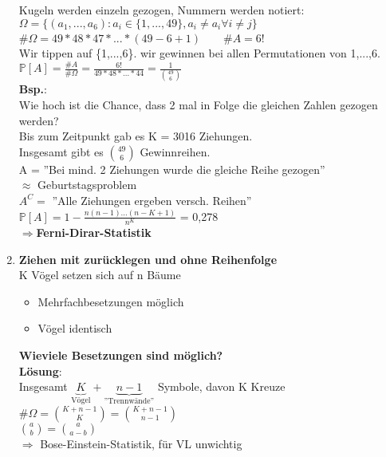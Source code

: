 \begin{enumerate}
	 Kugeln werden einzeln gezogen, Nummern werden notiert:\\
	 $\Omega = \{(a_1,...,a_6):a_i \in \{1,...,49\},a_i \neq a_i \forall i \neq j\}$\smallskip\\
	 \#$\Omega = 49*48*47*...*(49-6+1) \qquad \#A = 6! $\medskip\\
	 Wir tippen auf \{1,...,6\}. wir gewinnen bei allen Permutationen von 1,...,6.\\
	 $\mathds{P}[A] = \frac{\#A}{\#\Omega}=\frac{6!}{49*48*...*44} = \frac{1}{\binom{49}{6}}$\medskip\\
	 \textbf{Bsp.}:\\ Wie hoch ist die Chance, dass 2 mal in Folge die gleichen Zahlen gezogen werden?\\
	 Bis zum Zeitpunkt gab es K = 3016 Ziehungen.\\
	 Insgesamt gibt es $\binom{49}{6}$ Gewinnreihen.\\
	 A = ''Bei mind. 2 Ziehungen wurde die gleiche Reihe gezogen''\\$\approx$ Geburtstagsproblem\\
	 $A^C = $ ''Alle Ziehungen ergeben versch. Reihen''\\
	 $\mathds{P}[A] = 1 - \frac{n(n-1)...(n-K+1)}{n^K}$ = 0,278\\
	 $\Rightarrow$\textbf{Ferni-Dirar-Statistik}
	\item \textbf{Ziehen mit zurücklegen und ohne Reihenfolge}\\
	K Vögel setzen sich auf n Bäume
\begin{itemize}
	\item 	Mehrfachbesetzungen möglich
	\item 	Vögel identisch
\end{itemize}
\textbf{Wieviele Besetzungen sind möglich?}\medskip\\
\textbf{Lösung}:\\
Insgesamt $\underbrace{K}_\text{Vögel}+\underbrace{n-1}_\text{''Trennwände''}$ Symbole, davon K Kreuze\medskip\\
\#$\Omega = \binom{K+n-1}{K} = \binom{K+n-1}{n-1} $\medskip\\
$\binom{a}{b} = \binom{a}{a-b}$\smallskip\\
$\Rightarrow$ Bose-Einstein-Statistik, für VL unwichtig
\end{enumerate}

